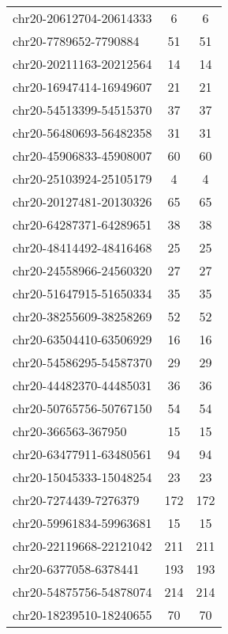 \begin{longtable}{lSS}
	chr20-20612704-20614333 & 6      & 6                          \\
	chr20-7789652-7790884   & 51     & 51                         \\
	chr20-20211163-20212564 & 14     & 14                         \\
	chr20-16947414-16949607 & 21     & 21                         \\
	chr20-54513399-54515370 & 37     & 37                         \\
	chr20-56480693-56482358 & 31     & 31                         \\
	chr20-45906833-45908007 & 60     & 60                         \\
	chr20-25103924-25105179 & 4      & 4                          \\
	chr20-20127481-20130326 & 65     & 65                         \\
	chr20-64287371-64289651 & 38     & 38                         \\
	chr20-48414492-48416468 & 25     & 25                         \\
	chr20-24558966-24560320 & 27     & 27                         \\
	chr20-51647915-51650334 & 35     & 35                         \\
	chr20-38255609-38258269 & 52     & 52                         \\
	chr20-63504410-63506929 & 16     & 16                         \\
	chr20-54586295-54587370 & 29     & 29                         \\
	chr20-44482370-44485031 & 36     & 36                         \\
	chr20-50765756-50767150 & 54     & 54                         \\
	chr20-366563-367950     & 15     & 15                         \\
	chr20-63477911-63480561 & 94     & 94                         \\
	chr20-15045333-15048254 & 23     & 23                         \\
	chr20-7274439-7276379   & 172    & 172                        \\
	chr20-59961834-59963681 & 15     & 15                         \\
	chr20-22119668-22121042 & 211    & 211                        \\
	chr20-6377058-6378441   & 193    & 193                        \\
	chr20-54875756-54878074 & 214    & 214                        \\
	chr20-18239510-18240655 & 70     & 70                         \\
\end{longtable}

